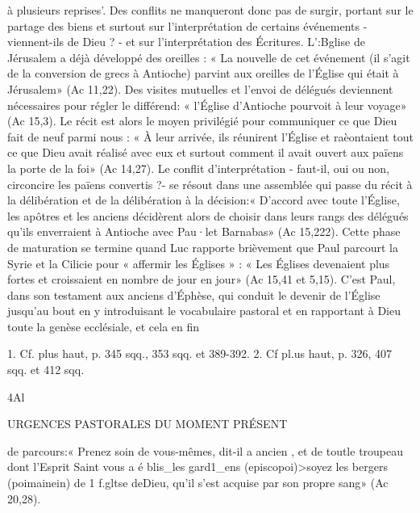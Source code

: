 à plusieurs reprises'. Des conflits ne manqueront donc pas de surgir, portant sur le partage des biens et surtout sur l'interprétation de certains événements - viennent-ils de Dieu ? - et sur l'interprétation des Écritures. L':Bglise de Jérusalem a déjà développé des oreilles : « La nouvelle de cet événement (il s'agit de la conversion de grecs à Antioche) parvint aux oreilles de l'Église qui était à Jérusalem» (Ac 11,22). Des visites mutuelles et l'envoi de délégués deviennent nécessaires pour régler le différend: « l'Église d'Antioche pourvoit à leur voyage» (Ac 15,3). Le récit est alors le moyen privilégié pour communiquer ce que Dieu fait de neuf parmi nous : « À leur arrivée, ils réunirent l'Église et raèontaient tout ce que Dieu avait réalisé avec eux et surtout comment il avait ouvert aux païens la porte de la foi» (Ac 14,27). Le conflit d'interprétation - faut-il, oui ou non, circoncire les païens convertis ?- se résout dans une assemblée qui passe du récit à la délibération et de la délibération à la décision:« D'accord avec toute l'Église, les apôtres et les anciens
décidèrent alors de choisir dans leurs rangs des délégués qu'ils enverraient à Antioche avec Pau·let Barnabas» (Ac 15,222).
Cette phase de maturation se termine quand Luc rapporte brièvement que Paul parcourt la Syrie et la Cilicie pour « affermir les Églises » : « Les Églises devenaient plus fortes et croissaient en nombre de jour en jour» (Ac 15,41 et 5,15). C'est Paul, dans son testament aux anciens d'Éphèse, qui conduit le devenir de l'Église jusqu'au bout en y introduisant le vocabulaire pastoral et en rapportant à Dieu toute la genèse ecclésiale, et cela en fin
 	
1.	Cf. plus haut, p. 345 sqq., 353 sqq. et 389-392.
2.	Cf pl.us haut, p. 326, 407 sqq. et 412 sqq.

4Al
 
URGENCES PASTORALES DU MOMENT PRÉSENT

de parcours:« Prenez soin de vous-mêmes, dit-il a  ancien , et de toutle troupeau dont l'Esprit Saint vous a é blis_les gard1_ens (episcopoi)>soyez les bergers (poimainein) de 1 f.gltse deDieu, qu'il s'est acquise par son propre sang» (Ac 20,28).

